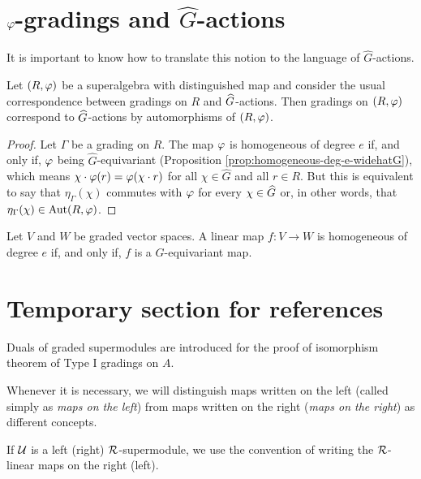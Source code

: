 \section{$\varphi$-gradings and $\widehat G$-actions}

It is important to know how to translate this notion to the language of $\widehat G$-actions.

\begin{prop}
	Let $(R, \varphi)$ be a superalgebra with distinguished map and consider the usual correspondence between gradings on $R$ and $\widehat G$-actions. Then gradings on $(R, \varphi)$ correspond to $\widehat G$-actions by automorphisms of $(R, \varphi)$.
\end{prop}

\begin{proof}
	Let $\Gamma$ be a grading on $R$. The map $\varphi$ is homogeneous of degree $e$ if, and only if, $\varphi$ being $\widehat G$-equivariant (Proposition \ref{prop:homogeneous-deg-e-widehatG}), which means $\chi\cdot \varphi (r) = \varphi (\chi\cdot r)$ for all $\chi \in \widehat G$ and all $r \in R$. But this is equivalent to say that $\eta_\Gamma(\chi)$ commutes with $\varphi$ for every $\chi \in \widehat G$ or, in other words, that $\eta_\Gamma(\chi) \in \operatorname{Aut} (R, \varphi)$.
\end{proof}

\begin{prop}\label{prop:homogeneous-deg-e-widehatG}
	Let $V$ and $W$ be graded vector spaces. A linear map $f: V \to W$ is homogeneous of degree $e$ if, and only if, $f$ is a $\widehat G$-equivariant map.
\end{prop}

\section{Temporary section for references}

Duals of graded supermodules are introduced for the proof of isomorphism theorem of Type I gradings on $A$.

\begin{convention}\label{conv:maps-left-right}
	Whenever it is necessary, we will distinguish maps written on the left (called simply as \emph{maps on the left}) from maps written on the  right (\emph{maps on the right}) as different concepts.

	If $\mathcal U$ is a left (right) $\mathcal R$-supermodule, we use the convention of writing the $\mathcal R$-linear maps on the right (left).
\end{convention}

